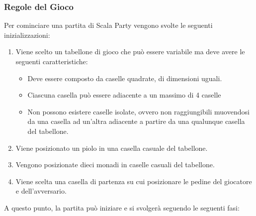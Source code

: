 \subsubsection{Regole del Gioco}
Per cominciare una partita di Scala Party 
vengono svolte le seguenti inizializzazioni:
\begin{enumerate}
    \item Viene scelto un tabellone di gioco che può essere variabile
    ma deve avere le seguenti caratteristiche:
    \begin{itemize}
        \item Deve essere composto da caselle quadrate, di dimensioni
        uguali.
        \item Ciascuna casella può essere adiacente a un massimo di 4 caselle
        \item Non possono esistere caselle isolate, ovvero non raggiungibili
        muovendosi da una casella ad un'altra adiacente a partire da una qualunque
        casella del tabellone.
    \end{itemize}
    \item Viene posizionato un piolo in una casella casuale del tabellone.
    \item Vengono posizionate dieci monadi in caselle casuali del tabellone.
    \item Viene scelta una casella di partenza su cui posizionare le pedine
    del giocatore e dell'avversario.
\end{enumerate} 
A questo punto, la partita può iniziare e si svolgerà seguendo le seguenti fasi:

